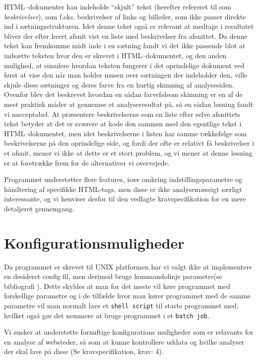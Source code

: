 \documentclass[a4paper,oneside]{memoir}
\begin{document}
HTML--dokumenter kan indeholde ``skjult'' tekst (herefter refereret til
som \textit{beskrivelser}), som f.eks. beskrivelser af links og
billeder, som ikke passer direkte ind i sætningsstrukturen. Idet denne
tekst også er relevant at medtage i resultatet bliver der efter hvert
afsnit vist en liste med beskrivelser fra afsnittet. Da denne tekst
kan fremkomme midt inde i en sætning fandt vi det ikke passende blot
at indsætte teksten hvor den er skrevet i HTML--dokumentet, og den
anden mulighed, at simulere hvordan teksten fungerer i det oprindelige
dokument ved først at vise den når man holder musen over sætningen der
indeholder den, ville skjule disse sætninger og deres farve fra en
hurtig skimning af analysesiden. Ovenfor blev det beskrevet hvordan en
sådan farvefølsom skimning er en af de mest praktisk måder at gennemse
et analyseresultat på, så en sådan løsning fandt vi uacceptabel. At
præsentere beskrivelserne som en liste efter selve afsnittets tekst
betyder at det er sværere at kode den sammen med den egentlige tekst i
HTML--dokumentet, men idet beskrivelserne i listen har samme rækkefølge
som beskrivelserne på den oprindelige side, og fordi der ofte er
relativt få beskrivelser i et afsnit, mener vi ikke at dette er et
stort problem, og vi mener at denne løsning er at foretrække frem for
de alternativer vi overvejede.

Programmet understøtter flere features, især omkring
indstillingsparametre og håndtering af specifikke HTML-tags, men disse
er ikke analysemæssigt særligt interessante, og vi henviser derfor til
den vedlagte kravspecifikation for en mere detaljeret gennemgang.

\section{Konfigurationsmuligheder}
\label{konfigurationsmuligheder}
Da programmet er skrevet til UNIX platformen har vi valgt ikke at implementere
en desideret config fil, men derimod bruge kommandolinje parametre(se
bibliografi \cite{artofunixbook}). Dette
skyldes at man for det meste vil køre programmet med forskellige parametre og i
de tilfælde hvor man kører programmet med de samme parametre vil man normalt
lave et \texttt{shell script} til starte programmet med, hvilket også gør det
nemmere at bruge programmet i et \texttt{batch job}.

Vi ønsker at understøtte fornuftige konfigurations muligheder som er relavante
for en analyse af websteder, så som at kunne kontrollere uddata og hvilke
analyser der skal lave på disse (Se kravspecifikation, krav: 4).
\end{document}
